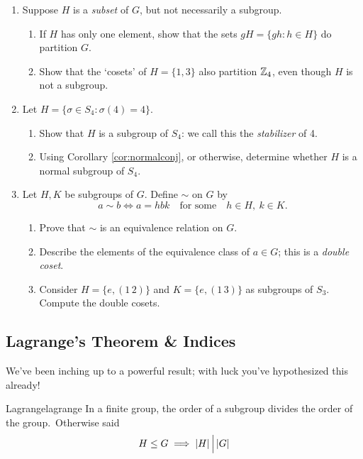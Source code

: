 \begin{exercises}{}{}
\begin{enumerate}
	  
	  \item\label{exs:partitioncoset} Suppose $H$ is a \emph{subset} of $G$, but not necessarily a subgroup.
	  \begin{enumerate}
	    \item If $H$ has only one element, show that the sets $gH=\{gh:h\in H\}$ do partition $G$.
	    \item Show that the `cosets' of $H=\{1,3\}$ also partition $\mathbb{Z}_4$, even though $H$ is not a subgroup.
	  \end{enumerate}
	  
	
		\item Let $H=\{\sigma\in S_4:\sigma(4)=4\}$.
		\begin{enumerate}
		  \item Show that $H$ is a subgroup of $S_4$: we call this the \emph{stabilizer} of 4.
		  \item Using Corollary \ref{cor:normalconj}, or otherwise, determine whether $H$ is a normal subgroup of $S_4$.
		\end{enumerate}
	  
		
		\item Let $H,K$ be subgroups of $G$. Define $\sim$ on $G$ by
		\[a\sim b\iff a=hbk\quad\text{for some}\quad h\in H,\ k\in K.\]
		\begin{enumerate}
	  	\item Prove that $\sim$ is an equivalence relation on $G$.
	  	\item Describe the elements of the equivalence class of $a\in G$; this is a \emph{double coset}.
	  	\item Consider $H=\{e,(1\,2)\}$ and $K=\{e,(1\,3)\}$ as subgroups of $S_3$. Compute the double cosets.
		\end{enumerate}
	\end{enumerate}
\end{exercises}


\clearpage


\subsection{Lagrange's Theorem \& Indices}\label{sec:lagrange}


We've been inching up to a powerful result; with luck you've hypothesized this already!

\begin{thm}{Lagrange}{lagrange}
In a finite group, the order of a subgroup divides the order of the group.\footnotemark\ Otherwise said
\[H\le G\implies \left| H\right|\Big\vert \left| G\right|\]
\end{thm}

